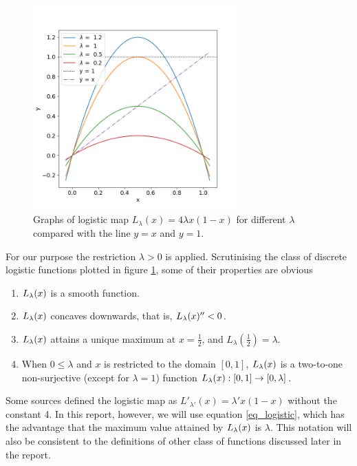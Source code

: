\begin{figure}[t]
	\centering
	\includegraphics[width=0.7\textwidth]{./figures/logistic_map_diff_lambda.png}
	\caption{Graphs of logistic map $L_{\lambda}(x) = 4 \lambda x(1-x)$ for different $\lambda$ compared with the line $y=x$ and $y = 1$.} 
	\label{fig:logistic_map_diff_lambda}
\end{figure}


For our purpose the restriction $\lambda >0$ is applied.
Scrutinising the class of discrete logistic functions plotted in figure \ref{fig:logistic_map_diff_lambda}, some of their properties are obvious

\begin{enumerate}
	\item $L_{\lambda}(x)$ is a smooth function.
	\item $L_{\lambda}(x)$ concaves downwards, that is, $L_{\lambda}(x)'' < 0$.
	\item $L_{\lambda}(x)$ attains a unique maximum at $x = \frac{1}{2}$, and $L_{\lambda}(\frac{1}{2}) = \lambda$.
	\item When $0 \leq \lambda$ and $x$ is restricted to the domain $[0, 1]$, $L_{\lambda}(x)$ is a two-to-one non-surjective (except for $\lambda = 1$) function $L_{\lambda}(x): [0,1] \rightarrow [0,\lambda]$. 
\end{enumerate}

Some sources defined the logistic map as $L'_{\lambda'}(x) = \lambda' x(1-x)$ without the constant 4. 
In this report, however, we will use equation \ref{eq_logistic}, which has the advantage that the maximum value attained by $L_{\lambda}(x)$ is $\lambda$. This notation will also be consistent to the definitions of other class of functions discussed later in the report.

